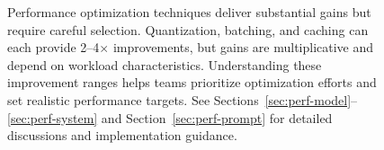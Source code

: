 \begin{figure}[t]
\begin{llmfigbox}
\end{llmfigbox}
\caption{Performance optimization techniques deliver substantial gains but require careful selection. Quantization, batching, and caching can each provide 2--4$\times$ improvements, but gains are multiplicative and depend on workload characteristics. Understanding these improvement ranges helps teams prioritize optimization efforts and set realistic performance targets. See Sections~\ref{sec:perf-model}--\ref{sec:perf-system} and Section~\ref{sec:perf-prompt} for detailed discussions and implementation guidance.}
\label{fig:ch07_opt_gains_callout}
\end{figure}


